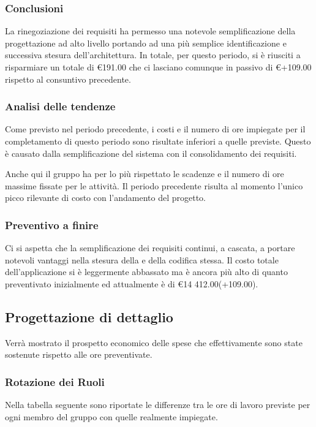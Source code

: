 \documentclass[12pt,a4paper]{article}
\begin{document}
\subsubsection{Conclusioni}
La rinegoziazione dei requisiti ha permesso una notevole semplificazione della progettazione ad alto livello portando ad una più semplice identificazione e successiva stesura dell'architettura. In totale, per questo periodo, si è riusciti a risparmiare un totale di \euro{}191.00 che ci lasciano comunque in passivo di \euro{}+109.00 rispetto al consuntivo precedente.

\subsubsection{Analisi delle tendenze}

\par Come previsto nel periodo precedente, i costi e il numero di ore impiegate per il completamento di questo periodo sono risultate inferiori a quelle previste. Questo è causato dalla semplificazione del sistema con il consolidamento dei requisiti. \\

\par Anche qui il gruppo ha per lo più rispettato le scadenze e il numero di ore massime fissate per le attività. Il periodo precedente risulta al momento l'unico picco rilevante di costo con l'andamento del progetto. \\

\subsubsection{Preventivo a finire}
Ci si aspetta che la semplificazione dei requisiti continui, a cascata, a portare notevoli vantaggi nella stesura della \DP{} e della codifica stessa. Il costo totale dell'applicazione si è leggermente abbassato ma è ancora più alto di quanto preventivato inizialmente ed attualmente è di \euro{}14 412.00(+109.00).

\newpage

\subsection{Progettazione di dettaglio}
Verrà mostrato il prospetto economico delle spese che effettivamente sono state sostenute rispetto alle ore preventivate.

\subsubsection{Rotazione dei Ruoli}
Nella tabella seguente sono riportate le differenze tra le ore di lavoro previste per ogni membro del gruppo con quelle realmente impiegate.
\end{document}
